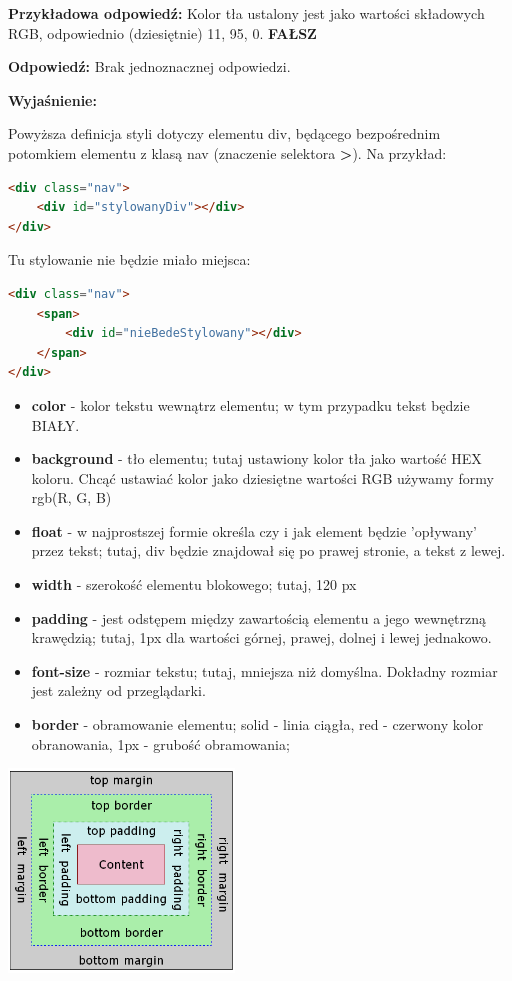 \noindent
{\textbf{Przykładowa odpowiedź:}}
Kolor tła ustalony jest jako wartości składowych RGB, odpowiednio (dziesiętnie) 11, 95, 0.
\textbf{FAŁSZ}

\vspace{0.4cm}
\noindent
\textbf{Odpowiedź:}
Brak jednoznacznej odpowiedzi.

\vspace{0.4cm}
\noindent
\textbf{Wyjaśnienie:}

Powyższa definicja styli dotyczy elementu div, będącego bezpośrednim potomkiem elementu z klasą nav (znaczenie selektora \textbf{>}).
Na przykład:
\begin{lstlisting}[language=html]
<div class="nav">
	<div id="stylowanyDiv"></div>
</div>
\end{lstlisting}

Tu stylowanie nie będzie miało miejsca:

\begin{lstlisting}[language=html]
<div class="nav">
	<span>
		<div id="nieBedeStylowany"></div>
	</span>
</div>
\end{lstlisting}


\begin{itemize}
\item
\textbf{color} - kolor tekstu wewnątrz elementu; w tym przypadku tekst będzie BIAŁY.
\item
\textbf{background} - tło elementu; tutaj ustawiony kolor tła jako wartość HEX koloru. Chcąć ustawiać kolor jako dziesiętne wartości RGB używamy formy rgb(R, G, B)
\item
\textbf{float} - w najprostszej formie określa czy i jak element będzie 'opływany' przez tekst; tutaj, div będzie znajdował się po prawej stronie, a tekst z lewej.
\item
\textbf{width} - szerokość elementu blokowego; tutaj, 120 px
\item
\textbf{padding} - jest odstępem między zawartością elementu a jego wewnętrzną krawędzią; tutaj, 1px dla wartości górnej, prawej, dolnej i lewej jednakowo.
\item
\textbf{font-size} - rozmiar tekstu; tutaj, mniejsza niż domyślna. Dokładny rozmiar jest zależny od przeglądarki.
\item
\textbf{border} - obramowanie elementu; solid - linia ciągła, red - czerwony kolor obranowania, 1px - grubość obramowania;
\end{itemize}
\begin{center}
\includegraphics[width=6cm]{09/boxmodel}
\end{center}

